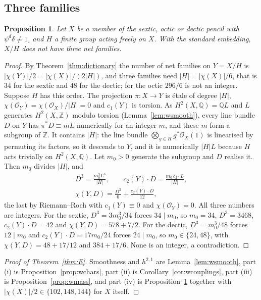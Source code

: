 \documentclass[11pt]{amsart}
\newtheorem{proposition}[theorem]{Proposition}
\theoremstyle{definition}
\theoremstyle{remark}
\newcommand{\Z}{\mathbb{Z}}
\newcommand{\Q}{\mathbb{Q}}
\newcommand{\cO}{\mathcal{O}}
\begin{document}
\subsection{Three families}

\begin{proposition}\label{prop:wthree}
Let $X$ be a member of the sextic, octic or dectic pencil with
$\psi^d\delta\ne1$, and $H$ a finite group acting freely on $X$. With the
standard embedding, $X/H$ does not have three net families.
\end{proposition}

\begin{proof}
By Theorem~\ref{thm:dictionary} the number of net families on $Y=X/H$ is
$|\chi(Y)|/2=|\chi(X)|/(2|H|)$, and three families need
$|H|=|\chi(X)|/6$, that is $34$ for the sextic and $48$ for the dectic; for
the octic $296/6$ is not an integer. Suppose $H$ has this order. The
projection $\pi\colon X\to Y$ is \'etale of degree $|H|$, $\chi(\cO_Y)=
\chi(\cO_X)/|H|=0$ and $c_1(Y)$ is torsion. As $H^2(X,\Q)=\Q L$ and $L$
generates $H^2(X,\Z)$ modulo torsion (Lemma~\ref{lem:wsmooth}), every line
bundle $D$ on $Y$ has $\pi^*D\equiv mL$ numerically for an integer $m$, and
these $m$ form a subgroup of $\Z$. It contains $|H|$: the line bundle
$\bigotimes_{g\in H}g^*\cO_X(1)$ is linearised by permuting its factors, so
it descends to $Y$, and it is numerically $|H|L$ because $H$ acts trivially
on $H^2(X,\Q)$. Let $m_0>0$ generate the subgroup and $D$ realise it. Then
$m_0$ divides $|H|$, and
\[
\begin{gathered}
D^3=\frac{m_0^3L^3}{|H|},\qquad c_2(Y)\cdot D=\frac{m_0\,c_2\cdot L}{|H|},\\
\chi(Y,D)=\frac{D^3}{6}+\frac{c_2(Y)\cdot D}{12},
\end{gathered}
\]
the last by Riemann--Roch with $c_1(Y)\equiv0$ and $\chi(\cO_Y)=0$. All
three numbers are integers. For the sextic, $D^3=3m_0^3/34$ forces
$34\mid m_0$, so $m_0=34$, $D^3=3468$, $c_2(Y)\cdot D=42$ and
$\chi(Y,D)=578+7/2$. For the dectic, $D^3=m_0^3/48$ forces $12\mid m_0$ and
$c_2(Y)\cdot D=17m_0/24$ forces $24\mid m_0$, so $m_0\in\{24,48\}$, with
$\chi(Y,D)=48+17/12$ and $384+17/6$. None is an integer, a contradiction.
\end{proof}

\begin{proof}[Proof of Theorem~\ref{thm:E}]
Smoothness and $h^{2,1}$ are Lemma~\ref{lem:wsmooth}, part (i) is
Proposition~\ref{prop:wchars}, part (ii) is
Corollary~\ref{cor:wcouplings}, part (iii) is Proposition~\ref{prop:wmass},
and part (iv) is Proposition~\ref{prop:wthree} together with
$|\chi(X)|/2\in\{102,148,144\}$ for $X$ itself.
\end{proof}
\end{document}
